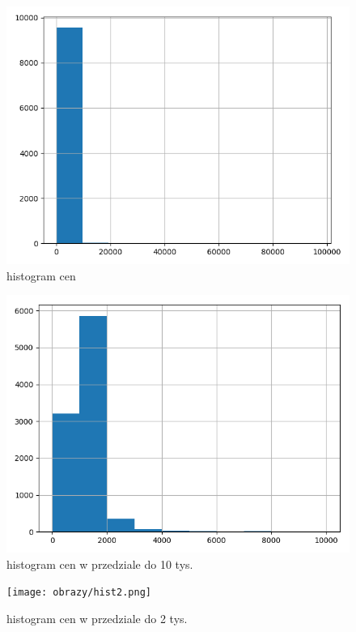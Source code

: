 \documentclass[a4paper,12pt]{article}
\begin{document}
		
		\begin{figure}[h]
					\centering
					\includegraphics[scale=0.6]{obrazy/hist.png} 
					\caption{histogram cen}
					\label{hist}
		\end{figure}
		\begin{figure}[h]
					\centering
					\includegraphics[scale=0.6]{obrazy/hist10.png} 
					\caption{histogram cen w przedziale do 10 tys.}
					\label{hist10k}
		\end{figure}
		\begin{figure}[h]
			\centering
			\texttt{[image: obrazy/hist2.png]} 
			\caption{histogram cen w przedziale do 2 tys.}
			\label{hist10k}
		\end{figure}
		
\end{document}
